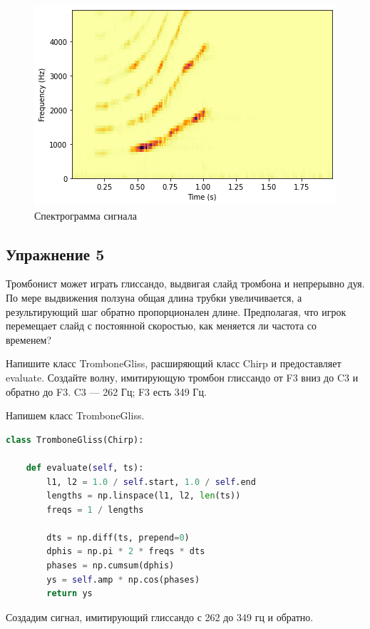 \begin{figure}[H]
	\begin{center}
		\includegraphics[scale=1]{fig/lab03/lab03_12.png}
		\caption{Спектрограмма сигнала}
	\end{center}
\end{figure}


\subsection{Упражнение 5}

Тромбонист может играть глиссандо, выдвигая слайд тромбона и непрерывно дуя. По мере выдвижения ползуна общая длина трубки увеличивается, а результирующий шаг обратно пропорционален длине.
Предполагая, что игрок перемещает слайд с постоянной скоростью, как меняется ли частота со временем?

\noindent Напишите класс TromboneGliss, расширяющий класс Chirp и предоставляет evaluate. Создайте волну, имитирующую тромбон глиссандо от F3 вниз до C3 и обратно до F3. C3 — 262 Гц; F3 есть 349 Гц.

Напишем класс TromboneGliss.

\begin{lstlisting}[language=Python]
class TromboneGliss(Chirp):
        
    def evaluate(self, ts):
        l1, l2 = 1.0 / self.start, 1.0 / self.end
        lengths = np.linspace(l1, l2, len(ts))
        freqs = 1 / lengths
        
        dts = np.diff(ts, prepend=0)
        dphis = np.pi * 2 * freqs * dts
        phases = np.cumsum(dphis)
        ys = self.amp * np.cos(phases)
        return ys
\end{lstlisting}

Создадим сигнал, имитирующий глиссандо с 262 до 349 гц и обратно.

